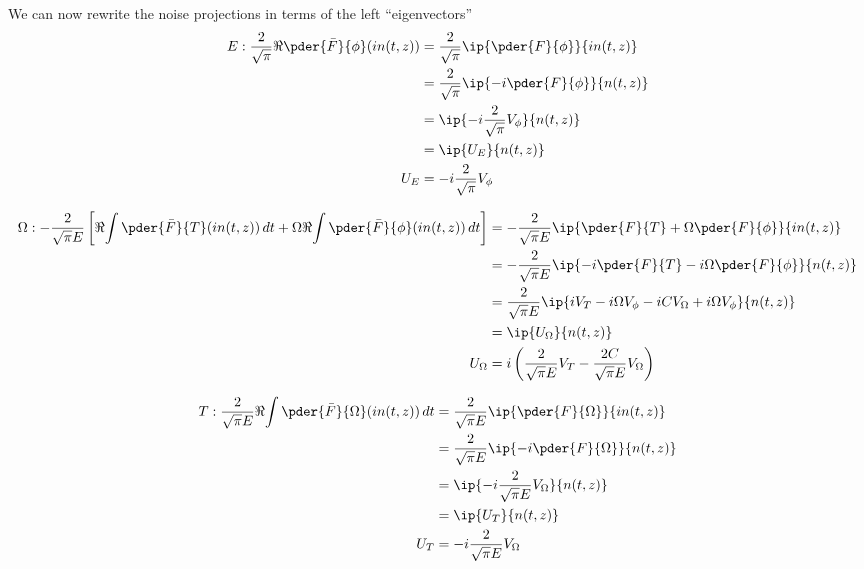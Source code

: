 We can now rewrite the noise projections in terms of the left ``eigenvectors''
\begin{equation}
\begin{split}
E: \frac{2}{\sqrt{\pi}}\Re{\pder{\bar{F}}{\phi} (i n(t,z))} &= \frac{2}{\sqrt{\pi}}\ip{\pder{F}{\phi}}{i n(t,z)} \\
&= \frac{2}{\sqrt{\pi}}\ip{-i\pder{F}{\phi}}{n(t,z)} \\
&= \ip{- i \frac{2}{\sqrt{\pi}} V_\phi}{n(t,z)} \\
&= \ip{U_E}{n(t,z)} \\
U_E &= - i \frac{2}{\sqrt{\pi}} V_\phi
\end{split}
\end{equation}




\begin{equation}
\begin{split}
\Omega: -\frac{2}{\sqrt{\pi}E }\left[\Re{\int \pder{\bar{F}}{T} (in(t,z))\,dt}  + \Omega\Re{\int \pder{\bar{F}}{\phi} (in(t,z))\,dt}\right] &= -\frac{2}{\sqrt{\pi}E }\ip{\pder{F}{T} + \Omega\pder{F}{\phi}}{i n(t,z)} \\
&= -\frac{2}{\sqrt{\pi}E }\ip{-i\pder{F}{T} - i\Omega\pder{F}{\phi}}{n(t,z)}\\
&= \frac{2}{\sqrt{\pi}E }\ip{iV_T - i\Omega V_\phi - iC V_\Omega + i\Omega V_\phi}{n(t,z)}\\
&= \ip{U_\Omega}{n(t,z)}\\
U_\Omega &=  i\left(\frac{2}{\sqrt{\pi}E }V_T  - \frac{2C}{\sqrt{\pi}E }V_\Omega\right) 
\end{split}
\end{equation}


\begin{equation}
\begin{split}
 T : \frac{2}{\sqrt{\pi} E}\Re{\int \pder{\bar{F}}{\Omega} (in(t,z))\,dt} &= \frac{2}{\sqrt{\pi} E}\ip{\pder{F}{\Omega}}{ in(t,z)} \\
&=  \frac{2}{\sqrt{\pi} E}\ip{-i\pder{F}{\Omega}}{ n(t,z)}\\
&=  \ip{-i\frac{2}{\sqrt{\pi} E} V_{\Omega} }{ n(t,z)}\\
&=  \ip{ U_T }{ n(t,z)}\\
U_T &=  -i\frac{2}{\sqrt{\pi} E} V_{\Omega}
\end{split}
\end{equation}

